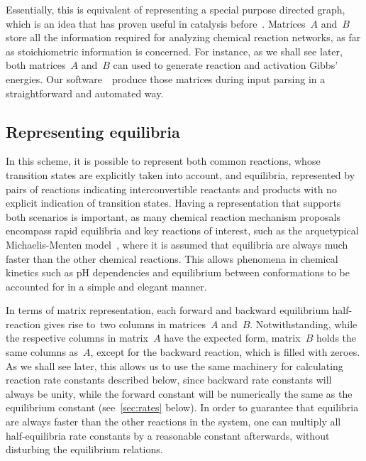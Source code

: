 Essentially,
this is equivalent of representing a special purpose directed graph,
which is an idea that has proven useful in catalysis before~\cite{Kozuch_2006,Kozuch_2015,Solel_2019}.
Matrices~$A$ and~$B$ store all the information required
for analyzing chemical reaction networks,
as far as stoichiometric information is concerned.
For instance,
as we shall see later,
both matrices~$A$ and~$B$ can used to generate reaction and activation Gibbs' energies.
Our software~\overreact{}~produce those matrices during input parsing in a straightforward and automated way.

\subsection{Representing equilibria}%
\label{sec:kin-repr-equi}

In this scheme,
it is possible to represent both common reactions,
whose transition states are explicitly taken into account,
and equilibria,
represented by pairs of reactions indicating interconvertible reactants
and products with no explicit indication of transition states.
Having a representation that supports both scenarios is important,
as many chemical reaction mechanism proposals
encompass rapid equilibria and key reactions of interest,
such as the arquetypical Michaelis-Menten model~\cite{Michaelis_1913,Johnson_2011,Srinivasan_2020,Srinivasan_2021},
where it is assumed that equilibria are always much faster than the other chemical reactions.
This allows phenomena in chemical kinetics such as pH dependencies and equilibrium between conformations
to be accounted for in a simple and elegant manner.

In terms of matrix representation,
each forward and backward equilibrium half-reaction gives rise to~two columns in matrices~$A$ and~$B$.
Notwithstanding,
while the respective columns in matrix~$A$ have the expected form,
matrix~$B$ holds the same columns as~$A$,
except for the backward reaction,
which is filled with zeroes.
As we shall see later,
this allows us to use the same machinery for calculating reaction rate constants described below,
since backward rate constants will always be unity,
while the forward constant will be numerically the same as the equilibrium constant (see~\cref{sec:rates} below).
In order to guarantee
that equilibria are always faster than the other reactions in the system,
one can multiply all half-equilibria rate constants by a reasonable constant afterwards,
without disturbing the equilibrium relations.


